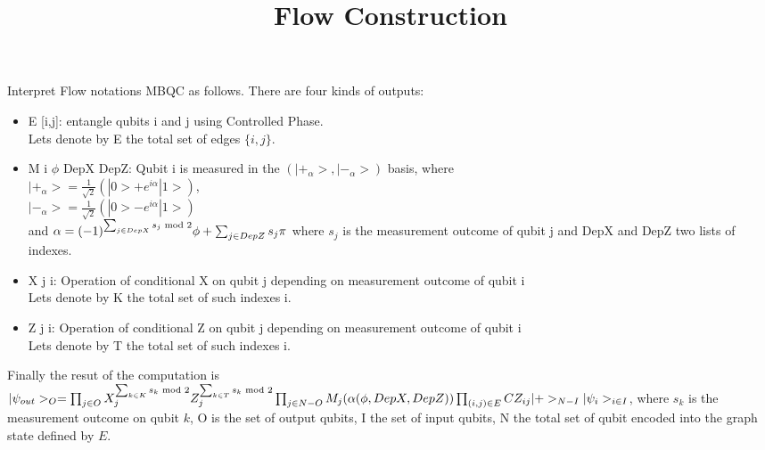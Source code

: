 \documentclass[10pts, a4paper]{article}
\title{ \begin{large}
\textbf{Flow Construction}
\end{large} 
}
\date{}
\begin{document}
\maketitle
Interpret Flow notations MBQC as follows. There are four kinds of outputs:
\begin{itemize}
\item E [i,j]: entangle qubits i and j using Controlled Phase. \\
Lets denote by E the total set of edges $\{i,j\}$.
\item M i $\phi$ DepX DepZ: Qubit i is measured in the $(|+_\alpha>, |-_\alpha>)$ basis, where\\
$|+_\alpha> = \frac{1}{\sqrt{2}}(|0> + e^{i\alpha}|1>)$,\\
$|-_\alpha> = \frac{1}{\sqrt{2}}(|0> - e^{i\alpha}|1>)$ \\
and $\alpha=(-1)^{\sum_{j\in DepX} s_j \textnormal{ mod 2}}\phi+\sum_{j\in DepZ}s_j\pi$ where $s_j$ is the measurement outcome of qubit j and DepX and DepZ two lists of indexes.
\item X j i: Operation of conditional X on qubit j depending on measurement outcome of qubit i\\
Lets denote by K the total set of such indexes i. 
\item Z j i: Operation of conditional Z on qubit j depending on measurement outcome of qubit i\\
Lets denote by T the total set of such indexes i. 
\end{itemize}
Finally the resut of the computation is \\
$|\psi_{out}>_O = \prod_{j\in O}X^{\sum_{k\in K}s_k \textnormal{ mod 2}}_j Z^{\sum_{k\in T}s_k \textnormal{ mod 2}}_j \prod_{j\in N-O} M_j(\alpha(\phi,DepX,DepZ)) \prod_{(i,j) \in E} CZ_{ij}|+>_{N-I}|\psi_i>_{i\in I}$, where $s_k$ is the measurement outcome on qubit $k$, O is the set of output qubits, I the set of input qubits, N the total set of qubit encoded into the graph state defined by $E$.  
\end{document}
